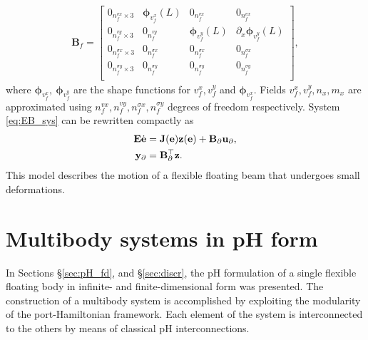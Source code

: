 \documentclass{svjour3}                     %
\newcommand{\secref}[1]{\S\ref{#1}}
\begin{document}
	\begin{align*}
	\mathbf{B}_{f} = \begin{bmatrix}
	0_{n_f^{vx} \times 3} & \bm{\phi}_{v_f^x}(L) & 0_{n_f^{vx}} & 0_{n_f^{vx}} \\
	0_{n_f^{vy} \times 3} & 0_{n_f^{vy}} & \bm{\phi}_{v_f^y}(L) & \partial_x \bm{\phi}_{v_f^y}(L) \\
	0_{n_f^{\sigma x} \times 3} & 0_{n_f^{\sigma x}} & 0_{n_f^{\sigma x}} & 0_{n_f^{\sigma x}} \\
	0_{n_f^{\sigma y} \times 3} & 0_{n_f^{\sigma y}} & 0_{n_f^{\sigma y}} & 0_{n_f^{\sigma y}} \\
	\end{bmatrix},
	\end{align*}
	where $\bm{\phi}_{v_f^x}, \ \bm{\phi}_{v_f^y}$ are the shape functions for ${v}_f^x, {v}_f^y$ and $\bm{\phi}_{v_f^x}$. Fields ${v}_f^x, {v}_f^y, n_x, m_x$ are approximated using $n_f^{vx}, n_f^{vy}, n_f^{\sigma x}, n_f^{\sigma y}$ degrees of freedom respectively. System \eqref{eq:EB_sys} can be rewritten compactly as
	\begin{equation}
	\label{eq:beam_discr}
	\begin{aligned}
	\mathbf{E} \dot{\mathbf{e}} &= \mathbf{J}(\mathbf{e}) \mathbf{z}(\mathbf{e}) + \mathbf{B}_\partial \mathbf{u}_\partial, \vspace{2mm} \\
	\mathbf{y}_\partial &= \mathbf{B}_\partial^{\top}  \mathbf{z}. \\
	\end{aligned}
	\end{equation}
	This model describes the motion of a flexible floating beam that undergoes small deformations. 
	
	\section{Multibody systems in pH form}
	\label{sec:MB_pH}
	In Sections \secref{sec:pH_fd}, and \secref{sec:discr}, the pH formulation of a single flexible floating body in infinite- and finite-dimensional form was presented. The construction of a multibody system is accomplished by exploiting the modularity of the port-Hamiltonian framework. Each element of the system is interconnected to the others by means of classical pH interconnections.
	
\end{document}
